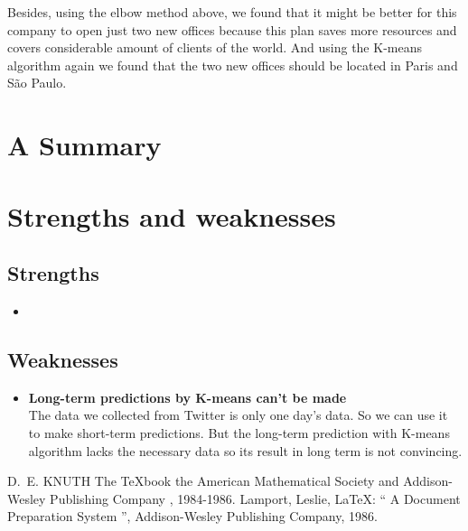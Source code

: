 \documentclass{mcmthesis}
\begin{document}
\indent Besides, using the elbow method above, we found that it might be better for this company to open just two new offices because this plan saves more resources and covers considerable amount of clients of the world. And using the K-means algorithm again we found that the two new offices should be located in Paris and São Paulo. 

\section{A Summary}

\section{Strengths and weaknesses}

\subsection{Strengths}
\begin{itemize}
\item 
\end{itemize}
\subsection{Weaknesses}
\begin{itemize}
  \item \textbf{Long-term predictions by K-means can't be made }\\
  The data we collected from Twitter is only one day's data. So we can use it to make short-term predictions. But the long-term prediction with K-means algorithm lacks the necessary data so its result in long term is not convincing.
\end{itemize}


\begin{thebibliography}{99}
 D.~E. KNUTH   The \TeX{}book  the American
Mathematical Society and Addison-Wesley
Publishing Company , 1984-1986.
Lamport, Leslie,  \LaTeX{}: `` A Document Preparation System '',
Addison-Wesley Publishing Company, 1986.
\end{thebibliography}
\end{document}
